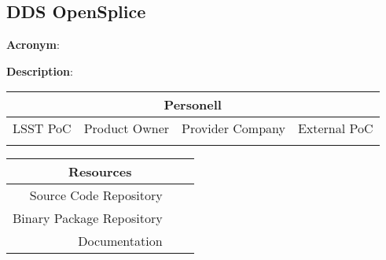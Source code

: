 \subsection{DDS OpenSplice}

\textbf{Acronym}:

\textbf{Description}:

\begin{longtable}[]{cccc}
\hline
\multicolumn{4}{c}{\textbf{Personell}} \\ \hline
LSST PoC   & Product Owner & Provider Company & External PoC \\ \hline
           &               &                  &              \\ \hline
\end{longtable}

\begin{longtable}[]{rll}
\hline
\multicolumn{3}{c}{\textbf{Resources}} \\ \hline
Source Code Repository     &  &  \\ \hline
Binary Package Repository  &  & \\ \hline
Documentation              &  &  \\ \hline
\end{longtable}

